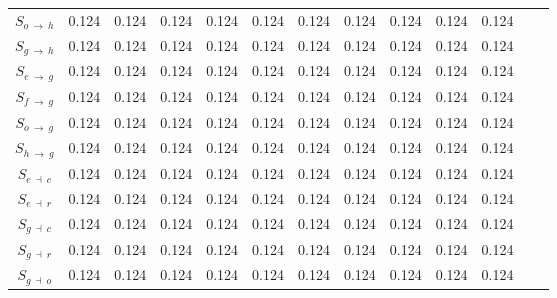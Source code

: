 \begin{ThreePartTable}
\begin{longtable}{c l *{10}{c} c}
        $S_{o \: \rightarrow \: h}$ & 0.124 &  0.124 &  0.124 &  0.124 &  0.124 &  0.124 &  0.124 &  0.124 &  0.124 &  0.124 \\
        
        $S_{g \: \rightarrow \: h}$ & 0.124 &  0.124 &  0.124 &  0.124 &  0.124 &  0.124 &  0.124 &  0.124 &  0.124 &  0.124 \\
        
        $S_{e \: \rightarrow \: g}$ & 0.124 &  0.124 &  0.124 &  0.124 &  0.124 &  0.124 &  0.124 &  0.124 &  0.124 &  0.124 \\
        
        $S_{f \: \rightarrow \: g}$ & 0.124 &  0.124 &  0.124 &  0.124 &  0.124 &  0.124 &  0.124 &  0.124 &  0.124 &  0.124 \\
        
        $S_{o \: \rightarrow \: g}$ & 0.124 &  0.124 &  0.124 &  0.124 &  0.124 &  0.124 &  0.124 &  0.124 &  0.124 &  0.124 \\
        
        $S_{h \: \rightarrow \: g}$ & 0.124 &  0.124 &  0.124 &  0.124 &  0.124 &  0.124 &  0.124 &  0.124 &  0.124 &  0.124 \\
        
        $S_{e \: \dashv \: c}$ & 0.124 &  0.124 &  0.124 &  0.124 &  0.124 &  0.124 &  0.124 &  0.124 &  0.124 &  0.124 \\
        
        $S_{e \: \dashv \: r}$ & 0.124 &  0.124 &  0.124 &  0.124 &  0.124 &  0.124 &  0.124 &  0.124 &  0.124 &  0.124 \\
        
        $S_{g \: \dashv \: c}$ & 0.124 &  0.124 &  0.124 &  0.124 &  0.124 &  0.124 &  0.124 &  0.124 &  0.124 &  0.124 \\
        
        $S_{g \: \dashv \: r}$ & 0.124 &  0.124 &  0.124 &  0.124 &  0.124 &  0.124 &  0.124 &  0.124 &  0.124 &  0.124 \\
        
        $S_{g \: \dashv \: o}$ & 0.124 &  0.124 &  0.124 &  0.124 &  0.124 &  0.124 &  0.124 &  0.124 &  0.124 &  0.124 \\
    \end{longtable}
\end{ThreePartTable}


